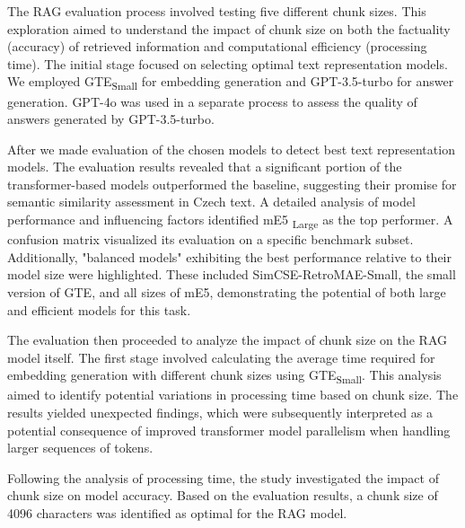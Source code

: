 The \ac{RAG} evaluation process involved testing five different chunk sizes.
This exploration aimed to understand the impact of chunk size on both the factuality (accuracy) of retrieved information and computational efficiency (processing time).
The initial stage focused on selecting optimal text representation models.
We employed \ac{GTE}\textsubscript{Small} for embedding generation and GPT-3.5-turbo for answer generation.
GPT-4o was used in a separate process to assess the quality of answers generated by GPT-3.5-turbo.

After we made evaluation of the chosen models to detect best text representation models.
The evaluation results revealed that a significant portion of the transformer-based models outperformed the baseline, suggesting their promise for semantic similarity assessment in Czech text.
A detailed analysis of model performance and influencing factors identified \ac{mE5} \textsubscript{Large} as the top performer.
A confusion matrix visualized its evaluation on a specific benchmark subset.
Additionally, "balanced models" exhibiting the best performance relative to their model size were highlighted.
These included SimCSE-RetroMAE-Small, the small version of \ac{GTE}, and all sizes of \ac{mE5}, demonstrating the potential of both large and efficient models for this task.

The evaluation then proceeded to analyze the impact of chunk size on the \ac{RAG} model itself.
The first stage involved calculating the average time required for embedding generation with different chunk sizes using \ac{GTE}\textsubscript{Small}.
This analysis aimed to identify potential variations in processing time based on chunk size.
The results yielded unexpected findings, which were subsequently interpreted as a potential consequence of improved transformer model parallelism when handling larger sequences of tokens.

Following the analysis of processing time, the study investigated the impact of chunk size on model accuracy.
Based on the evaluation results, a chunk size of 4096 characters was identified as optimal for the \ac{RAG} model.


